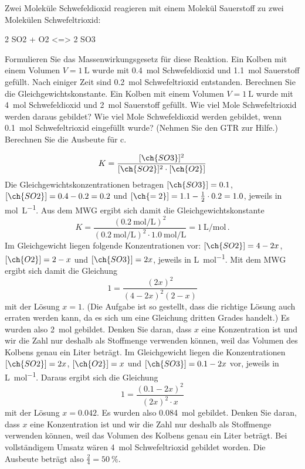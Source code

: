 \documentclass[DIV11]{scrartcl}
\begin{document}
\begin{question}[name=Schwefeltrioxidsynthese]
Zwei Moleküle Schwefeldioxid reagieren mit einem Molekül Sauerstoff  zu
zwei Molekülen Schwefeltrioxid:
\begin{reaction*}
 2 SO2 + O2 <=> 2 SO3
\end{reaction*}
\begin{tasks}
  \task Formulieren Sie das Massenwirkungsgesetz für diese Reaktion.
  \task Ein Kolben mit einem Volumen $V = \SI{1}{\liter}$ wurde mit
    \SI{0.4}{\mole} Schwefeldioxid und \SI{1.1}{\mole} Sauerstoff gefüllt.
    Nach einiger Zeit sind \SI{0.2}{\mole} Schwefeltrioxid entstanden.
    Berechnen Sie die Gleichgewichtskonstante.
  \task Ein Kolben mit einem Volumen $V = \SI{1}{\liter}$ wurde mit
    \SI{4}{\mole} Schwefeldioxid und \SI{2}{\mole} Sauerstoff gefüllt.  Wie
    viel Mole Schwefeltrioxid werden daraus gebildet?
  \task Wie viel Mole Schwefeldioxid werden gebildet, wenn \SI{0.1}{\mole}
    Schwefeltrioxid eingefüllt wurde? (Nehmen Sie den GTR zur Hilfe.)
  \task Berechnen Sie die Ausbeute für c.
\end{tasks}
\end{question}
\begin{solution}
  \begin{tasks}
    \task \[ K = \frac{[\ch{SO3}]^2}{[\ch{SO2}]^2\cdot[\ch{O2}]} \]
    \task Die Gleichgewichtskonzentrationen betragen $[\ch{SO3}]=0.1$,
      $[\ch{SO2}]=0.4-0.2=0.2$ und $[\ch{=2}]=1.1-\frac{1}{2}\cdot0.2=1.0$,
      jeweils in \si{\mole\per\liter}.  Aus dem MWG ergibt sich damit die
      Gleichgewichtskonstante
      \[
        K = \frac
              {(\SI{0.2}{\mole\per\liter})^2}
              {(\SI{0.2}{\mole\per\liter})^2\cdot\SI{1.0}{\mole\per\liter}}
          = \SI{1}{\liter\per\mole} \,.
      \]
    \task Im Gleichgewicht liegen folgende Konzentrationen vor: $[\ch{SO2}] =
      4-2x$, $[\ch{O2}]=2-x$ und $[\ch{SO3}]=2x$, jeweils in
      \si{\liter\per\mole}.  Mit dem MWG ergibt sich damit die Gleichung
      \[ 1 = \frac{(2x)^2}{(4-2x)^2(2-x)} \]
      mit der Lösung $x=1$.  (Die Aufgabe ist so gestellt, dass die richtige
      Lösung auch erraten werden kann, da es sich um eine Gleichung dritten
      Grades handelt.)  Es wurden also \SI{2}{\mole}  gebildet.
      Denken Sie daran, dass $x$ eine Konzentration ist und wir die Zahl nur
      deshalb als Stoffmenge verwenden können, weil das Volumen des Kolbens
      genau ein Liter beträgt.
    \task Im Gleichgewicht liegen die Konzentrationen $[\ch{SO2}] =
      2x$, $[\ch{O2}]=x$ und $[\ch{SO3}]=0.1-2x$ vor, jeweils in
      \si{\liter\per\mole}. Daraus ergibt sich die Gleichung
      \[ 1 = \frac{(0.1-2x)^2}{(2x)^2\cdot x} \]
      mit der Lösung $x=0.042$.  Es wurden also \SI{0.084}{\mole} 
      gebildet.  Denken Sie daran, dass $x$ eine Konzentration ist und wir die
      Zahl nur deshalb als Stoffmenge verwenden können, weil das Volumen des
      Kolbens genau ein Liter beträgt.
    \task Bei vollständigem Umsatz wären \SI{4}{\mole} Schwefeltrioxid
      gebildet worden.  Die Ausbeute beträgt also $\frac{2}{4} =
      \SI{50}{\percent}$.
  \end{tasks}
\end{solution}
\end{document}
